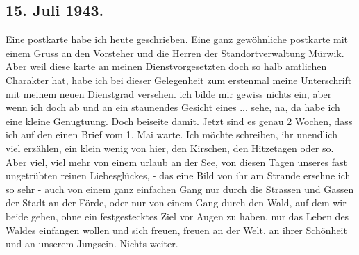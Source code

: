 \subsection{15. Juli 1943.}

Eine postkarte habe ich heute geschrieben.
Eine ganz gew\"{o}hnliche postkarte mit einem Gruss an den Vorsteher und die Herren der Standortverwaltung M\"{u}rwik.
Aber weil diese karte an meinen Dienstvorgesetzten doch so halb amtlichen Charakter hat, habe ich bei dieser Gelegenheit zum erstenmal meine Unterschrift mit meinem neuen Dienstgrad versehen.
ich bilde mir gewiss nichts ein, aber wenn ich doch ab und an ein staunendes Gesicht eines ... sehe, na, da habe ich eine kleine Genugtuung.
Doch beiseite damit.
Jetzt sind es genau 2 Wochen, dass ich auf den einen Brief vom 1. Mai warte.
Ich m\"{o}chte schreiben, ihr unendlich viel erz\"{a}hlen, ein klein wenig von hier, den Kirschen, den Hitzetagen oder so.
Aber viel, viel mehr von einem urlaub an der See, von diesen Tagen unseres fast ungetr\"{u}bten reinen Liebesgl\"{u}ckes, - das eine Bild von ihr am Strande ersehne ich so sehr - auch von einem ganz einfachen Gang nur durch die Strassen und Gassen der Stadt an der F\"{o}rde, oder nur von einem Gang durch den Wald, auf dem wir beide gehen, ohne ein festgestecktes Ziel vor Augen zu haben, nur das Leben des Waldes einfangen wollen und sich freuen, freuen an der Welt, an ihrer Sch\"{o}nheit und an unserem Jungsein.
Nichts weiter.

\clearpage
